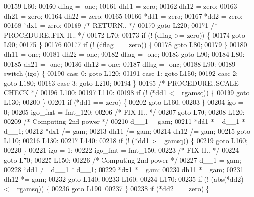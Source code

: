 \begin{DoxyCode}
00159 L60:
00160     dflag = -one;
00161     dh11 = zero;
00162     dh12 = zero;
00163     dh21 = zero;
00164     dh22 = zero;
00165 
00166     *dd1 = zero;
00167     *dd2 = zero;
00168     *dx1 = zero;
00169 \textcolor{comment}{/*         RETURN.. */}
00170     \textcolor{keywordflow}{goto} L220;
00171 \textcolor{comment}{/*     PROCEDURE..FIX-H.. */}
00172 L70:
00173     \textcolor{keywordflow}{if} (! (dflag >= zero)) \{
00174     \textcolor{keywordflow}{goto} L90;
00175     \}
00176 
00177     \textcolor{keywordflow}{if} (! (dflag == zero)) \{
00178     \textcolor{keywordflow}{goto} L80;
00179     \}
00180     dh11 = one;
00181     dh22 = one;
00182     dflag = -one;
00183     \textcolor{keywordflow}{goto} L90;
00184 L80:
00185     dh21 = -one;
00186     dh12 = one;
00187     dflag = -one;
00188 L90:
00189     \textcolor{keywordflow}{switch} (igo) \{
00190     \textcolor{keywordflow}{case} 0: \textcolor{keywordflow}{goto} L120;
00191     \textcolor{keywordflow}{case} 1: \textcolor{keywordflow}{goto} L150;
00192     \textcolor{keywordflow}{case} 2: \textcolor{keywordflow}{goto} L180;
00193     \textcolor{keywordflow}{case} 3: \textcolor{keywordflow}{goto} L210;
00194     \}
00195 \textcolor{comment}{/*     PROCEDURE..SCALE-CHECK */}
00196 L100:
00197 L110:
00198     \textcolor{keywordflow}{if} (! (*dd1 <= rgamsq)) \{
00199     \textcolor{keywordflow}{goto} L130;
00200     \}
00201     \textcolor{keywordflow}{if} (*dd1 == zero) \{
00202     \textcolor{keywordflow}{goto} L160;
00203     \}
00204     igo = 0;
00205     igo\_fmt = fmt\_120;
00206 \textcolor{comment}{/*              FIX-H.. */}
00207     \textcolor{keywordflow}{goto} L70;
00208 L120:
00209 \textcolor{comment}{/* Computing 2nd power */}
00210     d\_\_1 = gam;
00211     *dd1 *= d\_\_1 * d\_\_1;
00212     *dx1 /= gam;
00213     dh11 /= gam;
00214     dh12 /= gam;
00215     \textcolor{keywordflow}{goto} L110;
00216 L130:
00217 L140:
00218     \textcolor{keywordflow}{if} (! (*dd1 >= gamsq)) \{
00219     \textcolor{keywordflow}{goto} L160;
00220     \}
00221     igo = 1;
00222     igo\_fmt = fmt\_150;
00223 \textcolor{comment}{/*              FIX-H.. */}
00224     \textcolor{keywordflow}{goto} L70;
00225 L150:
00226 \textcolor{comment}{/* Computing 2nd power */}
00227     d\_\_1 = gam;
00228     *dd1 /= d\_\_1 * d\_\_1;
00229     *dx1 *= gam;
00230     dh11 *= gam;
00231     dh12 *= gam;
00232     \textcolor{keywordflow}{goto} L140;
00233 L160:
00234 L170:
00235     \textcolor{keywordflow}{if} (! (abs(*dd2) <= rgamsq)) \{
00236     \textcolor{keywordflow}{goto} L190;
00237     \}
00238     \textcolor{keywordflow}{if} (*dd2 == zero) \{

\end{DoxyCode}
